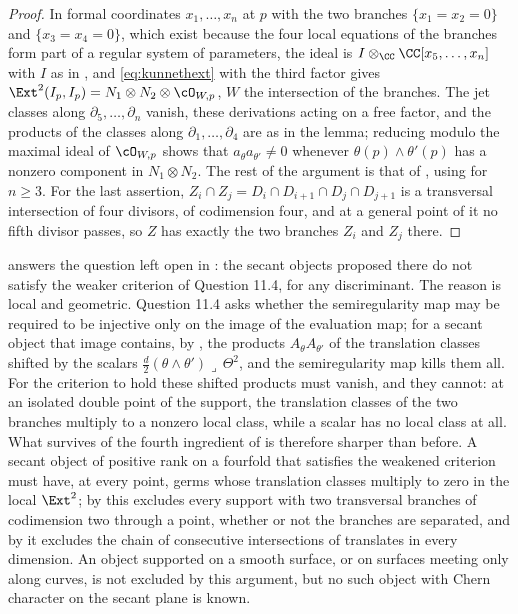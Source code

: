 \begin{proof}
In formal coordinates $x_{1},\dots,x_{n}$ at $p$ with the two branches
$\{x_{1}=x_{2}=0\}$ and $\{x_{3}=x_{4}=0\}$, which exist because the four
local equations of the branches form part of a regular system of
parameters, the ideal is
$I\otimes_{\CC}\CC[x_{5},\dots,x_{n}]$ with $I$ as in ,
and \eqref{eq:kunnethext} with the third factor gives
$\Ext^{2}(I_{p},I_{p})=N_{1}\otimes N_{2}\otimes\cO_{W,p}$, $W$ the
intersection of the branches. The jet classes along $\partial_{5},\dots,\partial_{n}$
vanish, these derivations acting on a free factor, and the products of the
classes along $\partial_{1},\dots,\partial_{4}$ are as in the lemma; reducing
modulo the maximal ideal of $\cO_{W,p}$ shows that $a_{\theta}a_{\theta'}\ne0$
whenever $\theta(p)\wedge\theta'(p)$ has a nonzero component in
$N_{1}\otimes N_{2}$. The rest of the argument is that of
, using  for $n\ge3$. For the last
assertion, $Z_{i}\cap Z_{j}=D_{i}\cap D_{i+1}\cap D_{j}\cap D_{j+1}$ is a
transversal intersection of four divisors, of codimension four, and at a
general point of it no fifth divisor passes, so $Z$ has exactly the two
branches $Z_{i}$ and $Z_{j}$ there.
\end{proof}

\begin{remark}\label{rem:candidatemeaning}
 answers the question left open in
\cite[Section 12]{Mar25b}: the secant objects proposed there do not satisfy
the weaker criterion of Question 11.4, for any discriminant. The reason is
local and geometric. Question 11.4 asks whether the semiregularity map may be
required to be injective only on the image of the evaluation map; for a
secant object that image contains, by , the products
$A_{\theta}A_{\theta'}$ of the translation classes shifted by the scalars
$\tfrac d2(\theta\wedge\theta')\lrcorner\,\Theta^{2}$, and the semiregularity
map kills them all. For the criterion to hold these shifted products must
vanish, and they cannot: at an isolated double point of the support, the
translation classes of the two branches multiply to a nonzero local class,
while a scalar has no local class at all. What survives of the fourth
ingredient of  is therefore sharper than before. A
secant object of positive rank on a fourfold that satisfies the weakened
criterion must have, at every point, germs whose translation classes multiply
to zero in the local $\Ext^{2}$; by  this excludes
every support with two transversal branches of codimension two through a
point, whether or not the branches are separated, and by
 it excludes the chain of consecutive
intersections of translates in every dimension. An object supported on a
smooth surface, or on surfaces meeting only along curves, is not excluded by
this argument, but no such object with Chern character on the secant plane
is known.
\end{remark}

